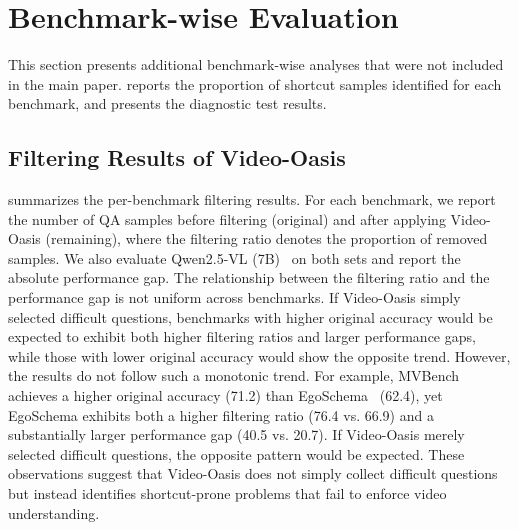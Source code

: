     \begin{table}[h]
    \centering
    \scriptsize
    \caption{Overlap of shortcut sets under alternative diagnostic model combinations.}
    \label{tab:robustness_overlap}
    \end{table}
    
\section{Benchmark-wise Evaluation} \label{sec:b}

    This section presents additional benchmark-wise analyses that were not included in the main paper. 
     reports the proportion of shortcut samples identified for each benchmark, and  presents the diagnostic test results.
    
    \subsection{Filtering Results of Video-Oasis} \label{sec:b.1}

         summarizes the per-benchmark filtering results. 
        For each benchmark, we report the number of QA samples before filtering (original) and after applying Video-Oasis (remaining), where the filtering ratio denotes the proportion of removed samples. 
        We also evaluate Qwen2.5-VL (7B)~\cite{qwen25vl} on both sets and report the absolute performance gap.
        The relationship between the filtering ratio and the performance gap is not uniform across benchmarks. 
        If Video-Oasis simply selected difficult questions, benchmarks with higher original accuracy would be expected to exhibit both higher filtering ratios and larger performance gaps, while those with lower original accuracy would show the opposite trend.
        However, the results do not follow such a monotonic trend. 
        For example, MVBench~\cite{mvbench} achieves a higher original accuracy (71.2) than EgoSchema~\cite{egoschema} (62.4), yet EgoSchema exhibits both a higher filtering ratio (76.4 vs. 66.9) and a substantially larger performance gap (40.5 vs. 20.7). If Video-Oasis merely selected difficult questions, the opposite pattern would be expected.
        These observations suggest that Video-Oasis does not simply collect difficult questions but instead identifies shortcut-prone problems that fail to enforce video understanding. 
        \vspace{-4mm}

